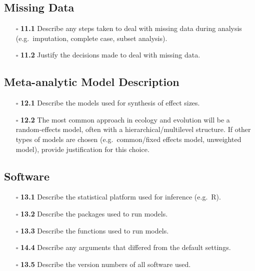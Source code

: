 \documentclass[11pt]{article}
\def\tightlist{}
\begin{document}
\begin{Form}
\subsection{Missing Data}\label{missing-data}

\begin{itemize}
\tightlist
\item[$\square$]
  \textbf{11.1} Describe any steps taken to deal with missing data
  during analysis (e.g.~imputation, complete case, subset analysis).
\item[$\square$]
  \textbf{11.2} Justify the decisions made to deal with missing data.
\end{itemize}

\subsection{Meta-analytic Model
Description}\label{meta-analytic-model-description}

\begin{itemize}
\tightlist
\item[$\square$]
  \textbf{12.1} Describe the models used for synthesis of effect sizes.
\item[$\square$]
  \textbf{12.2} The most common approach in ecology and evolution will
  be a random-effects model, often with a hierarchical/multilevel
  structure. If other types of models are chosen (e.g.~common/fixed
  effects model, unweighted model), provide justification for this
  choice.
\end{itemize}

\subsection{Software}\label{software}

\begin{itemize}
\tightlist
\item[$\square$]
  \textbf{13.1} Describe the statistical platform used for inference
  (e.g.~R).
\item[$\square$]
  \textbf{13.2} Describe the packages used to run models.
\item[$\square$]
  \textbf{13.3} Describe the functions used to run models.
\item[$\square$]
  \textbf{14.4} Describe any arguments that differed from the default
  settings.
\item[$\square$]
  \textbf{13.5} Describe the version numbers of all software used.
\end{itemize}


\end{Form}
\end{document}
